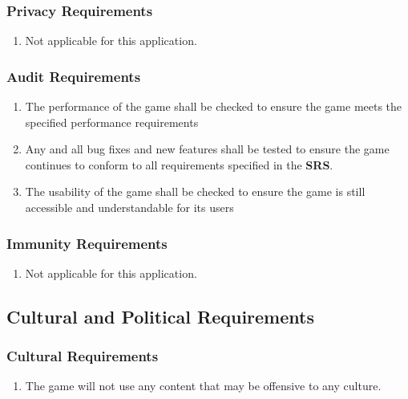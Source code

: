 \documentclass[]{article}
\begin{document}
\subsubsection{Privacy Requirements}
\label{ssub:privacy_requirements}
\begin{enumerate}[{SR}1. ]
	\item Not applicable for this application.
\end{enumerate}

\subsubsection{Audit Requirements}
\label{ssub:audit_requirements}
\begin{enumerate}[{SR}1. ]
	\item The performance of the game shall be checked to ensure the game meets the specified performance requirements
	\item Any and all bug fixes and new features shall be tested to ensure the game continues to conform to all requirements specified in the \textbf{SRS}.
	\item The usability of the game shall be checked to ensure the game is still accessible and understandable for its users
\end{enumerate}

\subsubsection{Immunity Requirements}
\label{ssub:immunity_requirements}
\begin{enumerate}[{SR}1. ]
	\item Not applicable for this application.
\end{enumerate}


\subsection{Cultural and Political Requirements}
\label{sub:cultural_and_political_requirements}

\subsubsection{Cultural Requirements}
\label{ssub:cultural_requirements}
\begin{enumerate}[{CP}1. ]
	\item The game will not use any content that may be offensive to any culture. 
\end{enumerate}
\end{document}
